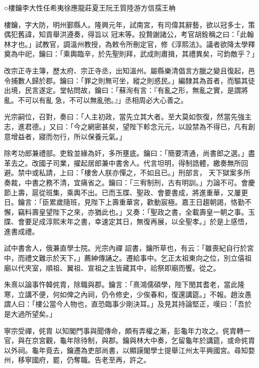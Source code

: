 
\begin{pinyinscope}

 ○樓鑰李大性任希夷徐應龍莊夏王阮王質陸游方信孺王柟



 樓鑰，字大防，明州鄞縣人。隆興元年，試南宮，有司偉其辭藝，欲以冠多士，策偶犯舊諱，知貢舉洪遵奏，得旨以
 冠末等。投贄謝諸公，考官胡銓稱之曰：「此翰林才也。」試教官，調溫州教授，為敕令所刪定官，修《淳熙法》。議者欲降太學釋奠為中祀，鑰曰：「乘輿臨辛，於先聖則拜，武成則肅揖，其禮異矣，可鈞敵乎？」



 改宗正寺主簿，歷太府、宗正寺丞，出知溫州。屬縣樂清倡言方臘之變且復起，邑令捕數人歸於郡。鑰曰：「罪之則無可坐，縱之則惑民。」編隸其為首者，而驅其徒出境，民言遂定。堂帖問故，鑰曰：「蘇洵有言：『有亂之形，無亂之實，是謂將亂。不可以有亂
 急，不可以無亂弛。』」丞相周必大心善之。



 光宗嗣位，召對，奏曰：「人主初政，當先立其大者。至大莫如恢復，然當先強主志，進君德。」又曰：「今之網密甚矣，望陛下軫念元元，以設禁為不得已，凡有創意增益者，寢而勿行，所以保養元氣。」



 除考功郎兼禮部。吏銓並緣為奸，多所壅底。鑰曰：「簡要清通，尚書郎之選。」盡革去之。改國子司業，擢起居郎兼中書舍人。代言坦明，得制誥體，繳奏無所回避。禁中或私請，上曰：「樓舍人朕亦憚之，不如且已。」刑部言，
 天下獄案多所奏裁，中書之務不清，宜痛省之。鑰曰：「三宥制刑，古有明訓。」力論不可。會慶節上壽，扈從班集，乘輿不出。已而玉牒、聖政、會要書成，將進重華，又屢更日。鑰言：「臣累歲隨班，見陛下上壽重華宮，歡動宸極。嘉王日趨朝謁，恪勤不懈，竊料壽皇望陛下之來，亦猶此也。」又奏：「聖政之書，全載壽皇一朝之事。玉牒、會要足成淳熙末年之書，幸速定其日，無復再展，以全聖孝。」於是上感悟，進書成禮。



 試中書舍人，俄兼直學士院。光宗內禪
 詔書，鑰所草也，有云：「雖喪紀自行於宮中，而禮文難示於天下。」薦紳傳誦之。遷給事中。乞正太祖東向之位，別立僖祖廟以代夾室，順祖、翼祖、宣祖之主皆藏其中，祫祭即廟而饗。從之。



 朱熹以論事忤韓侂胄，除職與郡。鑰言：「熹鴻儒碩學，陛下閔其耆老，當此隆寒，立講不便，何如俾之內祠，仍令修史，少俟春和，復還講筵。」不報。趙汝愚謂人曰：「樓公當今人物也，直恐臨事少剛決耳。」及見其持論堅正，嘆曰：「吾於是大過所望矣。」



 寧宗受禪，侂胄
 以知閣門事與聞傳命，頗有弄權之漸，彭龜年力攻之。侂胄轉一官，與在京宮觀，龜年除待制，與郡。鑰與林大中奏，乞留龜年於講筵，或命侂胄以外祠。龜年竟去，鑰遷為吏部尚書，以顯謨閣學士提舉江州太平興國宮。尋知婺州，移寧國府，罷，仍奪職。告老至再，許之。




\end{pinyinscope}

